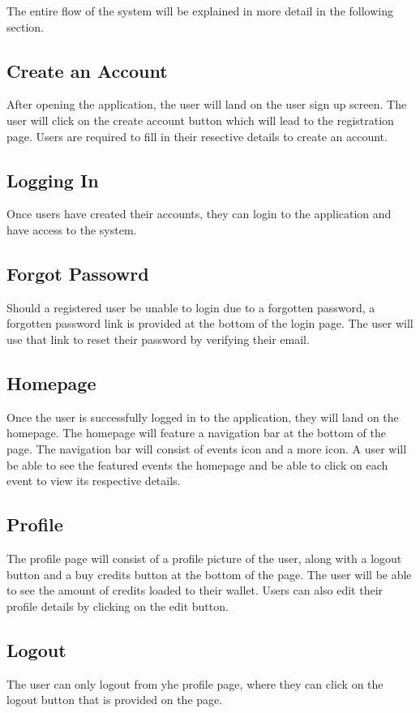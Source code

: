 The entire flow of the system will be explained in more detail in the following section.
 






 \subsection{Create an Account}
 After opening the application, the user will land on the user sign up screen.
 The user will click on the create account button which will lead to the registration page.
 Users are required to fill in their resective details to create an account.

 \subsection{Logging In}
 Once users have created their accounts, they can login to the application and have 
 access to the system.

 \subsection{Forgot Passowrd}
 Should a registered user be unable to login due to a forgotten password,
  a forgotten password link is provided at the bottom of the login page.
  The user will use that link to reset their password by verifying their email.

\subsection{Homepage}
Once the user is successfully logged in to the application, they will land on the homepage.
The homepage will feature a navigation bar at the bottom of the page. The navigation bar
will consist of events icon and a more icon. A user will be able to see the featured events 
the homepage and be able to click on each event to view its respective details.

 \subsection{Profile}
 The profile page will consist of a profile picture of the user, along with a logout button and
a buy credits button at the bottom of the page. 
The user will be able to see the amount of credits loaded to their wallet.
Users can also edit their profile details by clicking on the edit button. 


\subsection{Logout}
The user can only logout from yhe profile page, where they can click on the logout 
button that is provided on the page.

 






